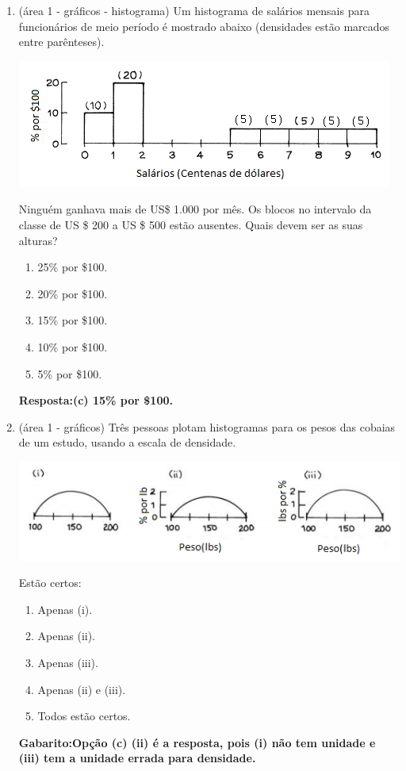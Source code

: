 \documentclass[12pt]{article}\documentclass[brazilian,12pt,a4paper,final]{article}
\begin{document}
\begin{enumerate}
\item (área 1 - gráficos - histograma) Um histograma de salários mensais para funcionários de meio período é mostrado abaixo (densidades
estão marcados entre parênteses).

 \includegraphics{Figuras/3C1.png}
 
Ninguém ganhava mais de US\$ 1.000 por mês. Os blocos
no intervalo da classe de US \$ 200 a US \$ 500 estão ausentes. Quais devem ser as suas alturas?

\begin{enumerate}[label=(\alph*)]
\item 25\% por \$100.
\item 20\% por \$100.
\item 15\% por \$100.
\item 10\% por \$100.
\item 5\% por \$100.
\end{enumerate}

\textbf{Resposta:(c) 15\% por \$100.}

\item(área 1 - gráficos) Três pessoas plotam histogramas para os pesos das cobaias de um estudo, usando a escala de densidade.

 \includegraphics{Figuras/3C2.png}
 
 Estão certos:
 \begin{enumerate}[label=(\alph*)]
\item Apenas (i).
 \item Apenas (ii).
 \item Apenas (iii).
 \item Apenas (ii) e (iii).
 \item Todos estão certos.
 \end{enumerate}
 \textbf{Gabarito:Opção (c) (ii) é a resposta, pois (i) não tem unidade e (iii) tem a unidade errada para densidade.}
 

\end{enumerate}
\end{document}
